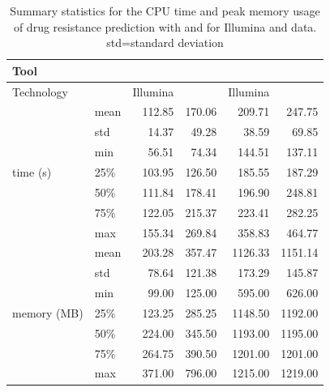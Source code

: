 \begin{table}
\centering
\begin{tabular}{|l|l|r|r|r|r|}
\hline
\multicolumn{2}{|l|}{Tool}       & \multicolumn{2}{c|}{\drprg{}} & \multicolumn{2}{c|}{\mykrobe{}} \\ \hline
\multicolumn{2}{|l|}{Technology} & Illumina     & \ont{}    & Illumina      & \ont{}     \\ \hline
\multirow{7}{*}{time (s)}    & mean  & 112.85       & 170.06      & 209.71        & 247.75       \\ \cline{2-6} 
                         & std   & 14.37        & 49.28       & 38.59         & 69.85        \\ \cline{2-6} 
                         & min   & 56.51        & 74.34       & 144.51        & 137.11       \\ \cline{2-6} 
                         & 25\%  & 103.95       & 126.50      & 185.55        & 187.29       \\ \cline{2-6} 
                         & 50\%  & 111.84       & 178.41      & 196.90        & 248.81       \\ \cline{2-6} 
                         & 75\%  & 122.05       & 215.37      & 223.41        & 282.25       \\ \cline{2-6} 
                         & max   & 155.34       & 269.84      & 358.83        & 464.77       \\ \hline
\multirow{7}{*}{memory (MB)}  & mean  & 203.28       & 357.47      & 1126.33       & 1151.14      \\ \cline{2-6} 
                         & std   & 78.64        & 121.38      & 173.29        & 145.87       \\ \cline{2-6} 
                         & min   & 99.00        & 125.00      & 595.00        & 626.00       \\ \cline{2-6} 
                         & 25\%  & 123.25       & 285.25      & 1148.50       & 1192.00      \\ \cline{2-6} 
                         & 50\%  & 224.00       & 345.50      & 1193.00       & 1195.00      \\ \cline{2-6} 
                         & 75\%  & 264.75       & 390.50      & 1201.00       & 1201.00      \\ \cline{2-6} 
                         & max   & 371.00       & 796.00      & 1215.00       & 1219.00      \\ \hline
\end{tabular}
\caption{Summary statistics for the CPU time and peak memory usage of drug resistance prediction with \mykrobe{} and \drprg{} for Illumina and \ont{} data. std=standard deviation}
\label{tab:predict-comp-pref}
\end{table}


